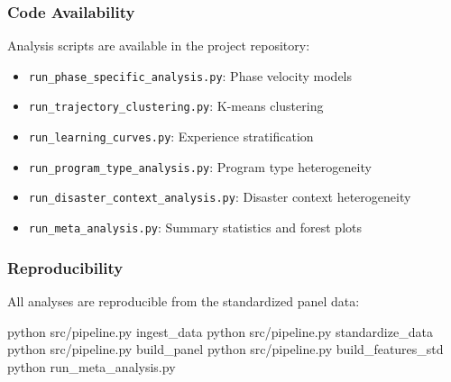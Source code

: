 \documentclass[
  12pt,
  letterpaper,
]{article}
\newenvironment{Shaded}{\begin{snugshade}}{\end{snugshade}}
\newcommand{\ExtensionTok}[1]{\textcolor[rgb]{0.00,0.23,0.31}{#1}}
\newcommand{\NormalTok}[1]{\textcolor[rgb]{0.00,0.23,0.31}{#1}}
\providecommand{\tightlist}{%
  \setlength{\itemsep}{0pt}\setlength{\parskip}{0pt}}
\begin{document}
\subsubsection{Code Availability}\label{code-availability}

Analysis scripts are available in the project repository:

\begin{itemize}
\tightlist
\item
  \texttt{run\_phase\_specific\_analysis.py}: Phase velocity models
\item
  \texttt{run\_trajectory\_clustering.py}: K-means clustering
\item
  \texttt{run\_learning\_curves.py}: Experience stratification
\item
  \texttt{run\_program\_type\_analysis.py}: Program type heterogeneity
\item
  \texttt{run\_disaster\_context\_analysis.py}: Disaster context
  heterogeneity
\item
  \texttt{run\_meta\_analysis.py}: Summary statistics and forest plots
\end{itemize}

\subsubsection{Reproducibility}\label{reproducibility}

All analyses are reproducible from the standardized panel data:

\begin{Shaded}
\begin{Highlighting}[]
\ExtensionTok{python}\NormalTok{ src/pipeline.py ingest\_data}
\ExtensionTok{python}\NormalTok{ src/pipeline.py standardize\_data}
\ExtensionTok{python}\NormalTok{ src/pipeline.py build\_panel}
\ExtensionTok{python}\NormalTok{ src/pipeline.py build\_features\_std}
\ExtensionTok{python}\NormalTok{ run\_meta\_analysis.py}
\end{Highlighting}
\end{Shaded}
\end{document}
